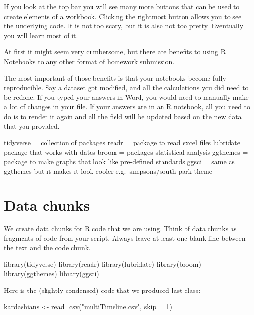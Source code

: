 \documentclass[
]{article}
\newenvironment{Shaded}{\begin{snugshade}}{\end{snugshade}}
\newcommand{\AttributeTok}[1]{\textcolor[rgb]{0.77,0.63,0.00}{#1}}
\newcommand{\DecValTok}[1]{\textcolor[rgb]{0.00,0.00,0.81}{#1}}
\newcommand{\FunctionTok}[1]{\textcolor[rgb]{0.00,0.00,0.00}{#1}}
\newcommand{\NormalTok}[1]{#1}
\newcommand{\OtherTok}[1]{\textcolor[rgb]{0.56,0.35,0.01}{#1}}
\newcommand{\StringTok}[1]{\textcolor[rgb]{0.31,0.60,0.02}{#1}}
\begin{document}
If you look at the top bar you will see many more buttons that can be
used to create elements of a workbook. Clicking the rightmost button
allows you to see the underlying code. It is not too scary, but it is
also not too pretty. Eventually you will learn most of it.

At first it might seem very cumbersome, but there are benefits to using
R Notebooks to any other format of homework submission.

The most important of those benefits is that your notebooks become fully
reproducible. Say a dataset got modified, and all the calculations you
did need to be redone. If you typed your answers in Word, you would need
to manually make a lot of changes in your file. If your answers are in
an R notebook, all you need to do is to render it again and all the
field will be updated based on the new data that you provided.

tidyverse = collection of packages readr = package to read excel files
lubridate = package that works with dates broom = packages statistical
analysis ggthemes = package to make graphs that look like pre-defined
standards ggsci = same as ggthemes but it makes it look cooler
e.g.~simpsons/south-park theme

\hypertarget{data-chunks}{%
\section{Data chunks}\label{data-chunks}}

We create data chunks for R code that we are using. Think of data chunks
as fragments of code from your script. Always leave at least one blank
line between the text and the code chunk.

\begin{Shaded}
\begin{Highlighting}[]
\FunctionTok{library}\NormalTok{(tidyverse)}
\FunctionTok{library}\NormalTok{(readr)}
\FunctionTok{library}\NormalTok{(lubridate)}
\FunctionTok{library}\NormalTok{(broom)}
\FunctionTok{library}\NormalTok{(ggthemes)}
\FunctionTok{library}\NormalTok{(ggsci)}
\end{Highlighting}
\end{Shaded}

Here is the (slightly condensed) code that we produced last class:

\begin{Shaded}
\begin{Highlighting}[]
\NormalTok{kardashians }\OtherTok{\textless{}{-}} \FunctionTok{read\_csv}\NormalTok{(}\StringTok{"multiTimeline.csv"}\NormalTok{, }\AttributeTok{skip =} \DecValTok{1}\NormalTok{)}
\end{Highlighting}
\end{Shaded}
\end{document}
